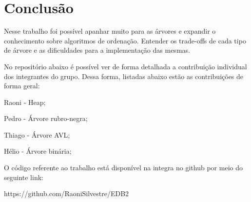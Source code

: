 \section{Conclusão}

Nesse trabalho foi possível apanhar muito para as árvores e 
expandir o conhecimento sobre algoritmos de ordenação. Entender os trade-offs
de cada tipo de árvore e as dificuldades para a implementação das mesmas.

No repositório abaixo é possível ver de forma detalhada a contribuição individual dos integrantes do grupo. Dessa forma, listadas abaixo estão as contribuições de forma geral:

Raoni - Heap;

Pedro - Árvore rubro-negra;

Thiago - Árvore AVL;

Hélio - Árvore binária;

O código referente ao trabalho está disponível na integra no github por meio do seguinte link:

https://github.com/RaoniSilvestre/EDB2
